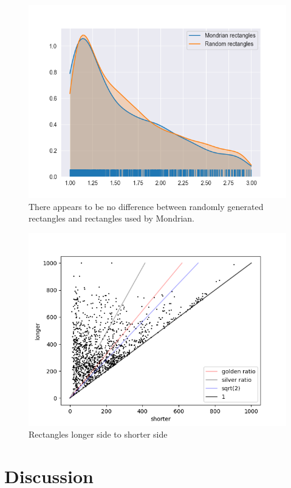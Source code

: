 \documentclass[serif,article,noparskip]{agse-thesis}
\begin{document}
\begin{figure}
\includegraphics[width=\linewidth]{images/aspect-max-min-rects.png}
\caption{There appears to be no difference between randomly generated rectangles and rectangles used by Mondrian.}
\label{fig:aspect-rects}
\end{figure}

\begin{figure}
\includegraphics[width=\linewidth]{images/longer-x-shorter.png}
\caption{Rectangles longer side to shorter side}
\label{fig:longer-x-shorter}
\end{figure}


\section{Discussion} \label{conclusion}
\end{document}
